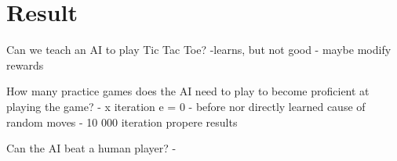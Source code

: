 \section{Result}

Can we teach an AI to play Tic Tac Toe?
-learns, but not good
- maybe modify rewards

How many practice games does the AI need to play to become proficient at playing the game?
- x iteration e = 0
- before nor directly learned cause of random moves
- 10 000 iteration propere results

Can the AI beat a human player?
-